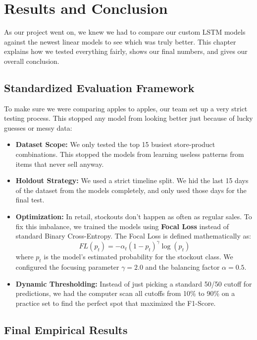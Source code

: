 \chapter{Results and Conclusion}
\label{chap:results}

As our project went on, we knew we had to compare our custom LSTM models against the newest linear models to see which was truly better. This chapter explains how we tested everything fairly, shows our final numbers, and gives our overall conclusion.

\section{Standardized Evaluation Framework}

To make sure we were comparing apples to apples, our team set up a very strict testing process. This stopped any model from looking better just because of lucky guesses or messy data:

\begin{itemize}
    \item \textbf{Dataset Scope:} We only tested the top 15 busiest store-product combinations. This stopped the models from learning useless patterns from items that never sell anyway.
    \item \textbf{Holdout Strategy:} We used a strict timeline split. We hid the last 15 days of the dataset from the models completely, and only used those days for the final test.
    \item \textbf{Optimization:} In retail, stockouts don't happen as often as regular sales. To fix this imbalance, we trained the models using \textbf{Focal Loss} instead of standard Binary Cross-Entropy. The Focal Loss is defined mathematically as:
    \begin{equation}
        FL(p_t) = -\alpha_t (1 - p_t)^\gamma \log(p_t)
    \end{equation}
    where $p_t$ is the model's estimated probability for the stockout class. We configured the focusing parameter $\gamma = 2.0$ and the balancing factor $\alpha = 0.5$.
    \item \textbf{Dynamic Thresholding:} Instead of just picking a standard 50/50 cutoff for predictions, we had the computer scan all cutoffs from 10\% to 90\% on a practice set to find the perfect spot that maximized the F1-Score.
\end{itemize}

\section{Final Empirical Results}

